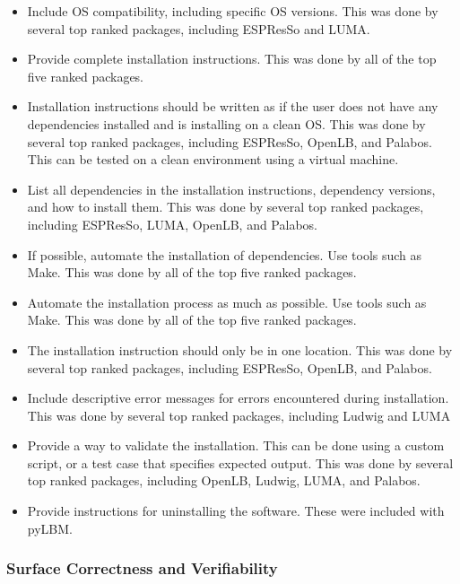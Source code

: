 \documentclass[final, 3p, times, authoryear]{elsarticle}
\begin{document}
\begin{itemize}
	\item Include OS compatibility, including specific OS versions. This was
	done by several top ranked packages, including ESPResSo and LUMA.
	\item Provide complete installation instructions. This was done by all of the top five ranked packages.
	\item Installation instructions should be written as if the user does not
	have any dependencies installed and is installing on a clean OS. This was
	done by several top ranked packages, including ESPResSo, OpenLB, and
	Palabos. This can be tested on a clean environment using a virtual machine.
	\item List all dependencies in the installation instructions, dependency
	versions, and how to install them. This was done by several top ranked
	packages, including ESPResSo, LUMA, OpenLB, and Palabos.
	\item If possible, automate the installation of dependencies. Use tools such
	as Make. This was done by all of the top five ranked packages.
	\item Automate the installation process as much as possible. Use tools such
	as Make. This was done by all of the top five ranked packages.
	\item The installation instruction should only be in one location. This was
	done by several top ranked packages, including ESPResSo, OpenLB, and
	Palabos.
	\item Include descriptive error messages for errors encountered during
	installation. This was done by several top ranked packages, including Ludwig
	and LUMA
	\item Provide a way to validate the installation. This can be done using a
	custom script, or a test case that specifies expected output. This was done
	by several top ranked packages, including OpenLB, Ludwig, LUMA, and Palabos.
	\item Provide instructions for uninstalling the software. These were
	included with pyLBM.
\end{itemize}

\subsubsection{Surface Correctness and Verifiability}
\end{document}
